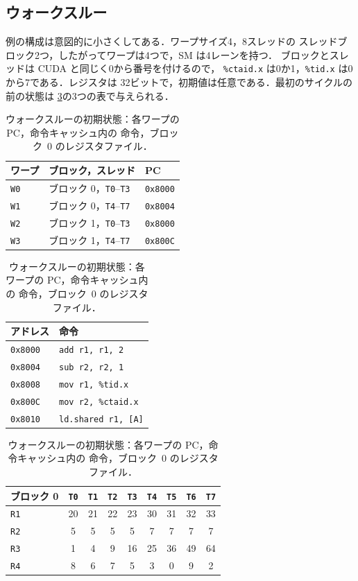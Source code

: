 \documentclass[../main.tex]{subfiles}
\begin{document}
\subsection{ウォークスルー}

例の構成は意図的に小さくしてある．ワープサイズ4，8スレッドの
スレッドブロック2つ，したがってワープは4つで，SM は4レーンを持つ．
ブロックとスレッドは CUDA と同じく0から番号を付けるので，
\texttt{\%ctaid.x} は0か1，\texttt{\%tid.x} は0から7である．レジスタは
32ビットで，初期値は任意である．最初のサイクルの前の状態は
\cref{tab:l04-walkthrough-state}の3つの表で与えられる．

\begin{table}[htbp]
  \centering
  \caption{ウォークスルーの初期状態：各ワープの PC，命令キャッシュ内の
    命令，ブロック~0 のレジスタファイル．}
  \label{tab:l04-walkthrough-state}
  \begin{tabular}{lll}
    \toprule
    ワープ & ブロック，スレッド & PC \\
    \midrule
    \texttt{W0} & ブロック 0，\texttt{T0}--\texttt{T3} & \texttt{0x8000} \\
    \texttt{W1} & ブロック 0，\texttt{T4}--\texttt{T7} & \texttt{0x8004} \\
    \texttt{W2} & ブロック 1，\texttt{T0}--\texttt{T3} & \texttt{0x8000} \\
    \texttt{W3} & ブロック 1，\texttt{T4}--\texttt{T7} & \texttt{0x800C} \\
    \bottomrule
  \end{tabular}
  \hspace{6mm}
  \begin{tabular}{ll}
    \toprule
    アドレス & 命令 \\
    \midrule
    \texttt{0x8000} & \texttt{add r1, r1, 2} \\
    \texttt{0x8004} & \texttt{sub r2, r2, 1} \\
    \texttt{0x8008} & \texttt{mov r1, \%tid.x} \\
    \texttt{0x800C} & \texttt{mov r2, \%ctaid.x} \\
    \texttt{0x8010} & \texttt{ld.shared r1, [A]} \\
    \bottomrule
  \end{tabular}

  \medskip
  \begin{tabular}{lcccccccc}
    \toprule
    ブロック 0 & \texttt{T0} & \texttt{T1} & \texttt{T2} & \texttt{T3} & \texttt{T4} & \texttt{T5} & \texttt{T6} & \texttt{T7} \\
    \midrule
    \texttt{R1} & 20 & 21 & 22 & 23 & 30 & 31 & 32 & 33 \\
    \texttt{R2} &  5 &  5 &  5 &  5 &  7 &  7 &  7 &  7 \\
    \texttt{R3} &  1 &  4 &  9 & 16 & 25 & 36 & 49 & 64 \\
    \texttt{R4} &  8 &  6 &  7 &  5 &  3 &  0 &  9 &  2 \\
    \bottomrule
  \end{tabular}
\end{table}
\end{document}
